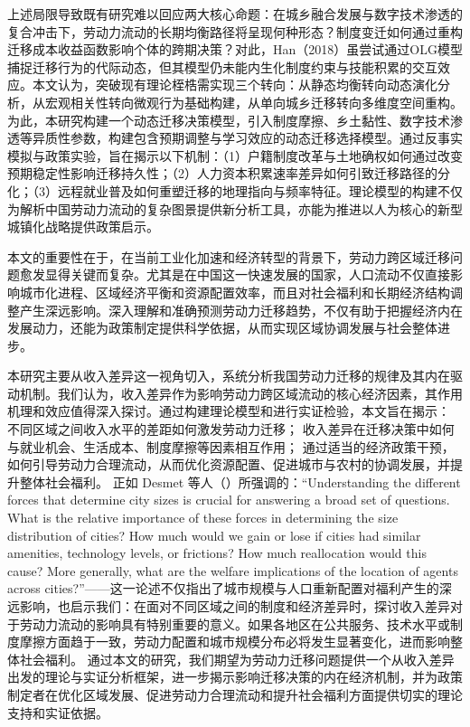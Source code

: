 \documentclass[a4paper,12pt,oneside]{book} %
\begin{document}
上述局限导致既有研究难以回应两大核心命题：在城乡融合发展与数字技术渗透的复合冲击下，劳动力流动的长期均衡路径将呈现何种形态？制度变迁如何通过重构迁移成本收益函数影响个体的跨期决策？对此，Han（2018）虽尝试通过OLG模型捕捉迁移行为的代际动态，但其模型仍未能内生化制度约束与技能积累的交互效应。本文认为，突破现有理论桎梏需实现三个转向：从静态均衡转向动态演化分析，从宏观相关性转向微观行为基础构建，从单向城乡迁移转向多维度空间重构。为此，本研究构建一个动态迁移决策模型，引入制度摩擦、乡土黏性、数字技术渗透等异质性参数，构建包含预期调整与学习效应的动态迁移选择模型。通过反事实模拟与政策实验，旨在揭示以下机制：（1）户籍制度改革与土地确权如何通过改变预期稳定性影响迁移持久性；（2）人力资本积累速率差异如何引致迁移路径的分化；（3）远程就业普及如何重塑迁移的地理指向与频率特征。理论模型的构建不仅为解析中国劳动力流动的复杂图景提供新分析工具，亦能为推进以人为核心的新型城镇化战略提供政策启示。


本文的重要性在于，在当前工业化加速和经济转型的背景下，劳动力跨区域迁移问题愈发显得关键而复杂。尤其是在中国这一快速发展的国家，人口流动不仅直接影响城市化进程、区域经济平衡和资源配置效率，而且对社会福利和长期经济结构调整产生深远影响。深入理解和准确预测劳动力迁移趋势，不仅有助于把握经济内在发展动力，还能为政策制定提供科学依据，从而实现区域协调发展与社会整体进步。

本研究主要从收入差异这一视角切入，系统分析我国劳动力迁移的规律及其内在驱动机制。我们认为，收入差异作为影响劳动力跨区域流动的核心经济因素，其作用机理和效应值得深入探讨。通过构建理论模型和进行实证检验，本文旨在揭示： 不同区域之间收入水平的差距如何激发劳动力迁移；  收入差异在迁移决策中如何与就业机会、生活成本、制度摩擦等因素相互作用；  通过适当的经济政策干预，如何引导劳动力合理流动，从而优化资源配置、促进城市与农村的协调发展，并提升整体社会福利。
正如 Desmet 等人（\cite{desmetUrbanAccountingWelfare2013}）所强调的：“Understanding the different forces that determine city sizes is crucial for answering a broad set of questions. What is the relative importance of these forces in determining the size distribution of cities? How much would we gain or lose if cities had similar amenities, technology levels, or frictions? How much reallocation would this cause? More generally, what are the welfare implications of the location of agents across cities?”——这一论述不仅指出了城市规模与人口重新配置对福利产生的深远影响，也启示我们：在面对不同区域之间的制度和经济差异时，探讨收入差异对于劳动力流动的影响具有特别重要的意义。如果各地区在公共服务、技术水平或制度摩擦方面趋于一致，劳动力配置和城市规模分布必将发生显著变化，进而影响整体社会福利。
通过本文的研究，我们期望为劳动力迁移问题提供一个从收入差异出发的理论与实证分析框架，进一步揭示影响迁移决策的内在经济机制，并为政策制定者在优化区域发展、促进劳动力合理流动和提升社会福利方面提供切实的理论支持和实证依据。
\end{document}
